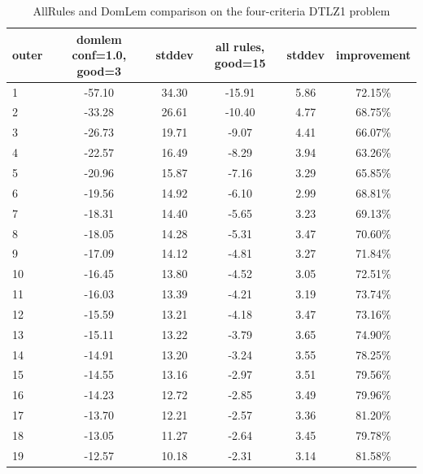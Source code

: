 \begin{table}[htb]
  \centering
  \begin{tabular}{l c c c c c}
    \hline
outer & domlem conf=1.0, good=3 & stddev & all rules, good=15 & stddev & improvement \\
    \hline
    \hline
1 & -57.10 & 34.30 & -15.91 & 5.86 & 72.15\% \\
2 & -33.28 & 26.61 & -10.40 & 4.77 & 68.75\% \\
3 & -26.73 & 19.71 & -9.07 & 4.41 & 66.07\% \\
4 & -22.57 & 16.49 & -8.29 & 3.94 & 63.26\% \\
5 & -20.96 & 15.87 & -7.16 & 3.29 & 65.85\% \\
6 & -19.56 & 14.92 & -6.10 & 2.99 & 68.81\% \\
7 & -18.31 & 14.40 & -5.65 & 3.23 & 69.13\% \\
8 & -18.05 & 14.28 & -5.31 & 3.47 & 70.60\% \\
9 & -17.09 & 14.12 & -4.81 & 3.27 & 71.84\% \\
10 & -16.45 & 13.80 & -4.52 & 3.05 & 72.51\% \\
11 & -16.03 & 13.39 & -4.21 & 3.19 & 73.74\% \\
12 & -15.59 & 13.21 & -4.18 & 3.47 & 73.16\% \\
13 & -15.11 & 13.22 & -3.79 & 3.65 & 74.90\% \\
14 & -14.91 & 13.20 & -3.24 & 3.55 & 78.25\% \\
15 & -14.55 & 13.16 & -2.97 & 3.51 & 79.56\% \\
16 & -14.23 & 12.72 & -2.85 & 3.49 & 79.96\% \\
17 & -13.70 & 12.21 & -2.57 & 3.36 & 81.20\% \\
18 & -13.05 & 11.27 & -2.64 & 3.45 & 79.78\% \\
19 & -12.57 & 10.18 & -2.31 & 3.14 & 81.58\% \\
    \hline
  \end{tabular}
  \caption{AllRules and DomLem comparison on the four-criteria DTLZ1 problem}
  \label{t:un_alldom_2b}
\end{table}


